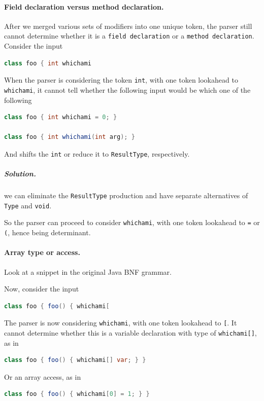 \documentclass[12pt]{article}
\begin{document}
\paragraph{Field declaration versus method declaration.}
After we merged various sets of modifiers into one unique token, the parser still cannot determine whether it is a \texttt{field declaration} or a \texttt{method declaration}. Consider the input

\begin{lstlisting}[language=Java]
class foo { int whichami
\end{lstlisting}
When the parser is considering the token \texttt{int}, with one token lookahead to \texttt{whichami}, it cannot tell whether the following input would be which one of the following
\begin{lstlisting}[language=Java]
class foo { int whichami = 0; }

class foo { int whichami(int arg); }
\end{lstlisting}
And shifts the \texttt{int} or reduce it to \texttt{ResultType}, respectively.

\subparagraph{Solution.} we can eliminate the \texttt{ResultType} production and have separate alternatives of \texttt{Type} and \texttt{void}.



So the parser can proceed to consider \texttt{whichami}, with one token lookahead to \texttt{=} or \texttt{(}, hence being determinant.

\paragraph{Array type or access.}
Look at a snippet in the original Java BNF grammar.

Now, consider the input
\begin{lstlisting}[language=Java]
class foo { foo() { whichami[
\end{lstlisting}
The parser is now considering \texttt{whichami}, with one token lookahead to \texttt{[}. It cannot determine whether this is a variable declaration with type of \texttt{whichami[]}, as in
\begin{lstlisting}[language=Java]
class foo { foo() { whichami[] var; } }
\end{lstlisting}
Or an array access, as in
\begin{lstlisting}[language=Java]
class foo { foo() { whichami[0] = 1; } }
\end{lstlisting}
\end{document}
